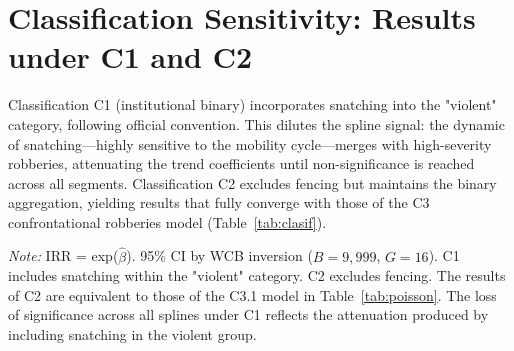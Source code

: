 \documentclass[pdflatex,sn-basic]{sn-jnl}
\newcommand{\tablenote}[1]{%
  \vspace{2pt}%
  {\par\footnotesize\textit{Note:} #1\par}%
}
\begin{document}
\clearpage
\appendix

\section{Classification Sensitivity: Results under C1 and C2}
\label{ap:clasif}

Classification C1 (institutional binary) incorporates snatching into the "violent" category, following official convention. This dilutes the spline signal: the dynamic of snatching---highly sensitive to the mobility cycle---merges with high-severity robberies, attenuating the trend coefficients until non-significance is reached across all segments. Classification C2 excludes fencing but maintains the binary aggregation, yielding results that fully converge with those of the C3 confrontational robberies model (Table~\ref{tab:clasif}).

\begin{table}[htbp]
\centering
\caption{Comparison of Poisson-QMLE results by binary classification}
\label{tab:clasif}
\footnotesize
{}
\tablenote{IRR = exp($\hat{\beta}$). 95\% CI by WCB inversion ($B=9,999$, $G=16$). C1 includes snatching within the "violent" category. C2 excludes fencing. The results of C2 are equivalent to those of the C3.1 model in Table~\ref{tab:poisson}. The loss of significance across all splines under C1 reflects the attenuation produced by including snatching in the violent group.}
\end{table}
\end{document}
